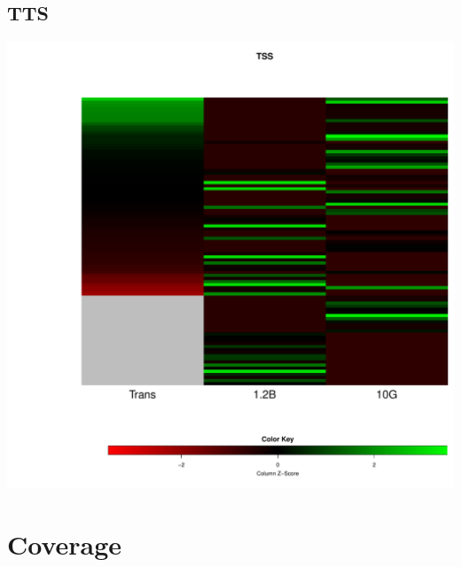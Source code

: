 \documentclass{article}\usepackage[]{graphicx}\usepackage[]{color}
\newenvironment{knitrout}{}{} %
\begin{document}
\subsection{TTS}
\begin{knitrout}
\color{fgcolor}

{\centering \includegraphics[width=.9\linewidth]{figure/minimal-heatmap_tts-1} 

}



\end{knitrout}

\clearpage
\section{Coverage}
\end{document}

